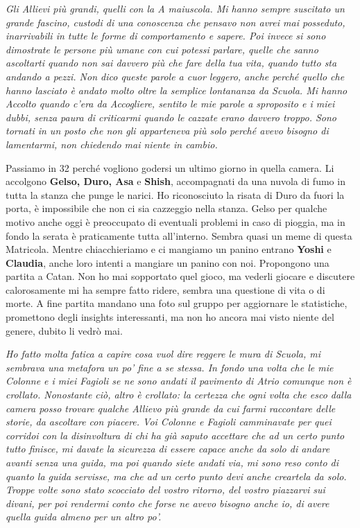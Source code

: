 \textit{Gli Allievi più grandi, quelli con la A maiuscola. Mi hanno sempre suscitato un grande fascino, custodi di una conoscenza che pensavo non avrei mai posseduto, inarrivabili in tutte le forme di comportamento e sapere. Poi invece si sono dimostrate le persone più umane con cui potessi parlare, quelle che sanno ascoltarti quando non sai davvero più che fare della tua vita, quando tutto sta andando a pezzi. Non dico queste parole a cuor leggero, anche perché quello che hanno lasciato è andato molto oltre la semplice lontananza da Scuola. Mi hanno Accolto quando c'era da Accogliere, sentito le mie parole a sproposito e i miei dubbi, senza paura di criticarmi quando le cazzate erano davvero troppo. Sono tornati in un posto che non gli apparteneva più solo perché avevo bisogno di lamentarmi, non chiedendo mai niente in cambio.}
\vspace{5mm}

Passiamo in 32 perché vogliono godersi un ultimo giorno in quella camera. Li accolgono \textbf{Gelso, Duro, Asa} e \textbf{Shish}, accompagnati da una nuvola di fumo in tutta la stanza che punge le narici. Ho riconosciuto la risata di Duro da fuori la porta, è impossibile che non ci sia cazzeggio nella stanza. Gelso per qualche motivo anche oggi è preoccupato di eventuali problemi in caso di pioggia, ma in fondo la serata è praticamente tutta all'interno. Sembra quasi un meme di questa Matricola. Mentre chiacchieriamo e ci mangiamo un panino entrano \textbf{Yoshi} e \textbf{Claudia}, anche loro intenti a mangiare un panino con noi. Propongono una partita a Catan. Non ho mai sopportato quel gioco, ma vederli giocare e discutere calorosamente mi ha sempre fatto ridere, sembra una questione di vita o di morte. A fine partita mandano una foto sul gruppo per aggiornare le statistiche, promettono degli insights interessanti, ma non ho ancora mai visto niente del genere, dubito li vedrò mai.
\vspace{5mm}

\textit{Ho fatto molta fatica a capire cosa vuol dire reggere le mura di Scuola, mi sembrava una metafora un po' fine a se stessa. In fondo una volta che le mie Colonne e i miei Fagioli se ne sono andati il pavimento di Atrio comunque non è crollato. Nonostante ciò, altro è crollato: la certezza che ogni volta che esco dalla camera posso trovare qualche Allievo più grande da cui farmi raccontare delle storie, da ascoltare con piacere. Voi Colonne e Fagioli camminavate per quei corridoi con la disinvoltura di chi ha già saputo accettare che ad un certo punto tutto finisce, mi davate la sicurezza di essere capace anche da solo di andare avanti senza una guida, ma poi quando siete andati via, mi sono reso conto di quanto la guida servisse, ma che ad un certo punto devi anche creartela da solo. Troppe volte sono stato scocciato del vostro ritorno, del vostro piazzarvi sui divani, per poi rendermi conto che forse ne avevo bisogno anche io, di avere quella guida almeno per un altro po'.}
\vspace{5mm}

